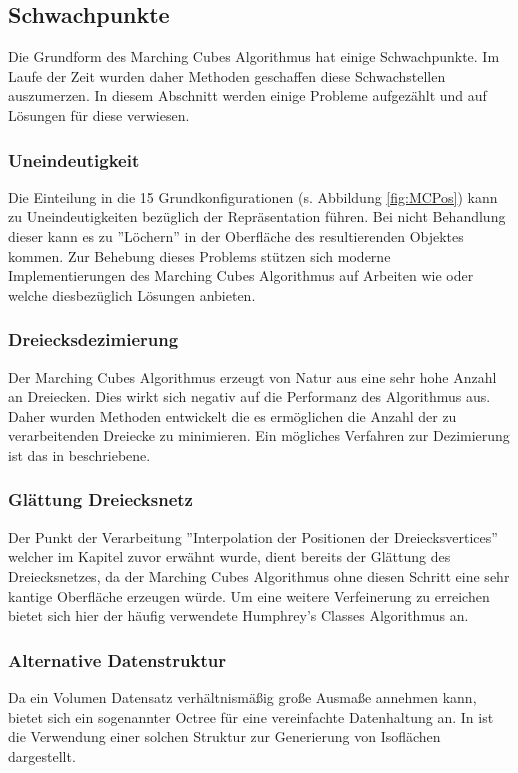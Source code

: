 \subsection{Schwachpunkte}
\label{sec:schwach}
Die Grundform des Marching Cubes Algorithmus hat einige Schwachpunkte. Im Laufe der Zeit wurden daher Methoden geschaffen diese Schwachstellen auszumerzen. In diesem Abschnitt werden einige Probleme aufgezählt und auf Lösungen für diese verwiesen.

\subsubsection{Uneindeutigkeit}
Die Einteilung in die 15 Grundkonfigurationen (s. Abbildung \ref{fig:MCPos}) kann zu Uneindeutigkeiten bezüglich der Repräsentation führen. Bei nicht Behandlung dieser kann es zu ''Löchern'' in der Oberfläche des resultierenden Objektes kommen. Zur Behebung dieses Problems stützen sich moderne Implementierungen des Marching Cubes Algorithmus auf Arbeiten wie \citep{Leak1} oder \citep{Leak2} welche diesbezüglich Lösungen anbieten.
\subsubsection{Dreiecksdezimierung}
Der Marching Cubes Algorithmus erzeugt von Natur aus eine sehr hohe Anzahl an Dreiecken. Dies wirkt sich negativ auf die Performanz des Algorithmus aus. Daher wurden Methoden entwickelt die es ermöglichen die Anzahl der zu verarbeitenden Dreiecke zu minimieren. Ein mögliches Verfahren zur Dezimierung ist das in \citep{DecTri} beschriebene.
\subsubsection{Glättung Dreiecksnetz}
Der Punkt der Verarbeitung ''Interpolation der Positionen der Dreiecksvertices'' welcher im Kapitel zuvor erwähnt wurde, dient bereits der Glättung des Dreiecksnetzes, da der Marching Cubes Algorithmus ohne diesen Schritt eine sehr kantige Oberfläche erzeugen würde. Um eine weitere Verfeinerung zu erreichen bietet sich hier der häufig verwendete Humphrey’s Classes Algorithmus \citep{Verf} an.
\subsubsection{Alternative Datenstruktur}
Da ein Volumen Datensatz verhältnismäßig große Ausmaße annehmen kann, bietet sich ein sogenannter Octree für eine vereinfachte Datenhaltung an. In \citep{Octree} ist die Verwendung einer solchen Struktur zur Generierung von Isoflächen dargestellt.

